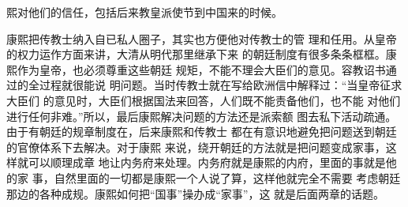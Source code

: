 熙对他们的信任，包括后来教皇派使节到中国来的时候。%
\par
康熙把传教士纳入自已私人圈子，其实也方便他对传教士的管%
理和任用。从皇帝的权力运作方面来讲，大清从明代那里继承下来%
的朝廷制度有很多条条框框。康熙作为皇帝，也必须尊重这些朝廷%
规矩，不能不理会大臣们的意见。容教诏书通过的全过程就很能说%
明问题。当时传教士就在写给欧洲信中解释过：“当皇帝征求大臣们%
的意见时，大臣们根据国法来回答，人们既不能责备他们，也不能%
对他们进行任何非难。”所以，最后康熙解决问题的方法还是派索额%
图去私下活动疏通。由于有朝廷的规章制度在，后来康熙和传教士%
都在有意识地避免把问题送到朝廷的官僚体系下去解决。对于康熙%
来说，绕开朝廷的方法就是把问题变成家事，这样就可以顺理成章%
地让内务府来处理。内务府就是康熙的内府，里面的事就是他的家%
事，自然里面的一切都是康熙一个人说了算，这样他就完全不需要%
考虑朝廷那边的各种成规。康熙如何把“国事”操办成“家事”，这%
就是后面两章的话题。%
